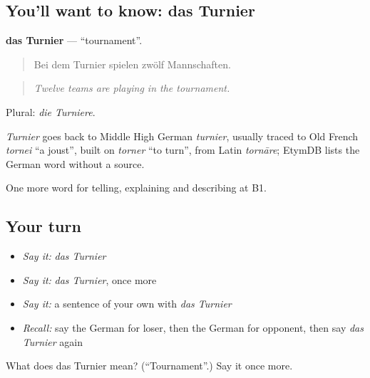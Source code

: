 \subsection*{You'll want to know: das Turnier}
\textbf{das Turnier} — \textquotedblleft{}tournament\textquotedblright{}.

\begin{quote}
Bei dem Turnier spielen zwölf Mannschaften.
\end{quote}

\begin{quote}
\emph{Twelve teams are playing in the tournament.}
\end{quote}

Plural: \emph{die Turniere}.

\begin{cousinweb}
\emph{Turnier} goes back to Middle High German \emph{turnier}, usually traced to Old French \emph{tornei} \textquotedblleft{}a joust\textquotedblright{}, built on \emph{torner} \textquotedblleft{}to turn\textquotedblright{}, from Latin \emph{tornāre}; EtymDB lists the German word without a source.
\end{cousinweb}

\begin{grammarlens}[title={What you've built}]
One more word for telling, explaining and describing at B1.
\end{grammarlens}

\subsection*{Your turn}
\begin{itemize}
\raggedright
  \item \emph{Say it:} \emph{das Turnier}
  \item \emph{Say it:} \emph{das Turnier}, once more
  \item \emph{Say it:} a sentence of your own with \emph{das Turnier}
  \item \emph{Recall:} say the German for loser, then the German for opponent, then say \emph{das Turnier} again
\end{itemize}

\begin{tcolorbox}[breakable,colback=teal!4,colframe=teal!35!black,title={Before you move on}]
What does das Turnier mean? (\textquotedblleft{}Tournament\textquotedblright{}.) Say it once more.
\end{tcolorbox}
